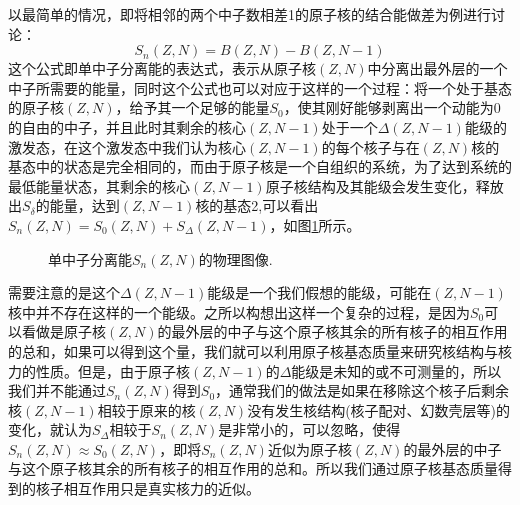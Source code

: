 以最简单的情况，即将相邻的两个中子数相差1的原子核的结合能做差为例进行讨论：
\begin{equation*}
S_n(Z,N)=B(Z,N)-B(Z,N-1)
\end{equation*}
这个公式即单中子分离能的表达式，表示从原子核$(Z,N)$中分离出最外层的一个中子所需要的能量，同时这个公式也可以对应于这样的一个过程：将一个处于基态的原子核$(Z,N)$，给予其一个足够的能量$S_0$，使其刚好能够剥离出一个动能为0的自由的中子，并且此时其剩余的核心$(Z,N-1)$处于一个$\Delta(Z,N-1)$能级的激发态，在这个激发态中我们认为核心$(Z,N-1)$的每个核子与在$(Z,N)$核的基态中的状态是完全相同的，而由于原子核是一个自组织的系统，为了达到系统的最低能量状态，其剩余的核心$(Z,N-1)$原子核结构及其能级会发生变化，释放出$S_\delta$的能量，达到$(Z,N-1)$核的基态2,可以看出$S_n(Z,N)=S_0(Z,N)+S_\Delta(Z,N-1)$，如图\ref{fig_Sn}所示。
\begin{figure}[H]
\centering
{}
\quad
\centering
{}
\caption{单中子分离能$S_n(Z,N)$的物理图像.\label{fig_Sn}}
\end{figure}
需要注意的是这个$\Delta(Z,N-1)$能级是一个我们假想的能级，可能在$(Z,N-1)$核中并不存在这样的一个能级。之所以构想出这样一个复杂的过程，是因为$S_0$可以看做是原子核$(Z,N)$的最外层的中子与这个原子核其余的所有核子的相互作用的总和，如果可以得到这个量，我们就可以利用原子核基态质量来研究核结构与核力的性质。但是，由于原子核$(Z,N-1)$的$\Delta$能级是未知的或不可测量的，所以我们并不能通过$S_n(Z,N)$得到$S_0$，通常我们的做法是如果在移除这个核子后剩余核$(Z,N-1)$相较于原来的核$(Z,N)$没有发生核结构(核子配对、幻数壳层等)的变化，就认为$S_\Delta$相较于$S_n(Z,N)$是非常小的，可以忽略，使得$S_n(Z,N)\approx S_0(Z,N)$，即将$S_n(Z,N)$近似为原子核$(Z,N)$的最外层的中子与这个原子核其余的所有核子的相互作用的总和。所以我们通过原子核基态质量得到的核子相互作用只是真实核力的近似。

